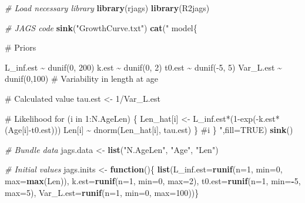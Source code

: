 \documentclass[
]{krantz}
\makeatletter
\newenvironment{Shaded}{\begin{snugshade}}{\end{snugshade}}
\newcommand{\AttributeTok}[1]{\textcolor[rgb]{0.27,0.27,0.27}{#1}}
\newcommand{\CommentTok}[1]{\textcolor[rgb]{0.37,0.37,0.37}{\textit{#1}}}
\newcommand{\ConstantTok}[1]{\textcolor[rgb]{0.37,0.37,0.37}{#1}}
\newcommand{\ControlFlowTok}[1]{\textcolor[rgb]{0.27,0.27,0.27}{\textbf{#1}}}
\newcommand{\DecValTok}[1]{\textcolor[rgb]{0.06,0.06,0.06}{#1}}
\newcommand{\FunctionTok}[1]{\textcolor[rgb]{0.27,0.27,0.27}{\textbf{#1}}}
\newcommand{\NormalTok}[1]{#1}
\newcommand{\OtherTok}[1]{\textcolor[rgb]{0.37,0.37,0.37}{#1}}
\newcommand{\SpecialCharTok}[1]{\textcolor[rgb]{0.43,0.43,0.43}{\textbf{#1}}}
\newcommand{\StringTok}[1]{\textcolor[rgb]{0.5,0.5,0.5}{#1}}
\newenvironment{kframe}{%
\medskip{}
\setlength{\fboxsep}{.8em}
 \def\at@end@of@kframe{}%
 \ifinner\ifhmode%
  \def\at@end@of@kframe{\end{minipage}}%
  \begin{minipage}{\columnwidth}%
 \fi\fi%
 \def\FrameCommand##1{\hskip\@totalleftmargin \hskip-\fboxsep
 \colorbox{shadecolor}{##1}\hskip-\fboxsep
     \hskip-\linewidth \hskip-\@totalleftmargin \hskip\columnwidth}%
 \MakeFramed {\advance\hsize-\width
   \@totalleftmargin\z@ \linewidth\hsize
   \@setminipage}}%
 {\par\unskip\endMakeFramed%
 \at@end@of@kframe}
\renewenvironment{Shaded}{\begin{kframe}}{\end{kframe}}
\makeatother
\begin{document}
\begin{Shaded}
\begin{Highlighting}[]
\CommentTok{\# Load necessary library}
\FunctionTok{library}\NormalTok{(rjags)}
\FunctionTok{library}\NormalTok{(R2jags)}

\CommentTok{\# JAGS code}
\FunctionTok{sink}\NormalTok{(}\StringTok{"GrowthCurve.txt"}\NormalTok{)}
\FunctionTok{cat}\NormalTok{(}\StringTok{"}
\StringTok{model\{}

\StringTok{\# Priors}

\StringTok{ L\_inf.est \textasciitilde{} dunif(0, 200)}
\StringTok{ k.est \textasciitilde{} dunif(0, 2)}
\StringTok{ t0.est \textasciitilde{} dunif({-}5, 5)}
\StringTok{ Var\_L.est \textasciitilde{} dunif(0,100)   \# Variability in length at age}

\StringTok{\# Calculated value}
\StringTok{ tau.est \textless{}{-} 1/Var\_L.est}

\StringTok{\# Likelihood}
\StringTok{ for (i in 1:N.AgeLen) \{}
\StringTok{    Len\_hat[i] \textless{}{-} L\_inf.est*(1{-}exp({-}k.est*(Age[i]{-}t0.est)))}
\StringTok{    Len[i] \textasciitilde{} dnorm(Len\_hat[i], tau.est)}
\StringTok{ \} \#i}
\StringTok{\}}
\StringTok{    "}\NormalTok{,}\AttributeTok{fill=}\ConstantTok{TRUE}\NormalTok{)}
\FunctionTok{sink}\NormalTok{()}

\CommentTok{\# Bundle data}
\NormalTok{jags.data }\OtherTok{\textless{}{-}} \FunctionTok{list}\NormalTok{(}\StringTok{"N.AgeLen"}\NormalTok{, }\StringTok{"Age"}\NormalTok{, }\StringTok{"Len"}\NormalTok{)}

\CommentTok{\# Initial values}
\NormalTok{jags.inits }\OtherTok{\textless{}{-}} \ControlFlowTok{function}\NormalTok{()\{ }\FunctionTok{list}\NormalTok{(}\AttributeTok{L\_inf.est=}\FunctionTok{runif}\NormalTok{(}\AttributeTok{n=}\DecValTok{1}\NormalTok{, }\AttributeTok{min=}\DecValTok{0}\NormalTok{, }\AttributeTok{max=}\FunctionTok{max}\NormalTok{(Len)),}
                               \AttributeTok{k.est=}\FunctionTok{runif}\NormalTok{(}\AttributeTok{n=}\DecValTok{1}\NormalTok{, }\AttributeTok{min=}\DecValTok{0}\NormalTok{, }\AttributeTok{max=}\DecValTok{2}\NormalTok{),}
                               \AttributeTok{t0.est=}\FunctionTok{runif}\NormalTok{(}\AttributeTok{n=}\DecValTok{1}\NormalTok{, }\AttributeTok{min=}\SpecialCharTok{{-}}\DecValTok{5}\NormalTok{, }\AttributeTok{max=}\DecValTok{5}\NormalTok{),}
                               \AttributeTok{Var\_L.est=}\FunctionTok{runif}\NormalTok{(}\AttributeTok{n=}\DecValTok{1}\NormalTok{, }\AttributeTok{min=}\DecValTok{0}\NormalTok{, }\AttributeTok{max=}\DecValTok{100}\NormalTok{))\}}


\end{Highlighting}
\end{Shaded}
\end{document}
